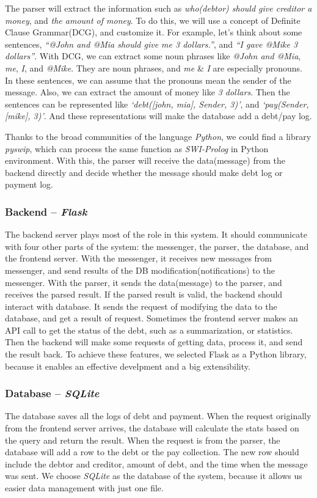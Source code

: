 \documentclass[11pt]{article}
\begin{document}
The parser will extract the information such as
\textit{who(debtor) should give creditor a money}, and \textit{the amount of money}.
To do this, we will use a concept of Definite Clause Grammar(DCG), and customize it.
For example, let's think about some sentences,
\textit{``@John and @Mia should give me 3 dollars.''},
and \textit{``I gave @Mike 3 dollars''}.
With DCG, we can extract some noun phrases like
\textit{@John and @Mia}, \textit{me}, \textit{I}, and \textit{@Mike}.
They are noun phrases, and \textit{me} \& \textit{I} are especially pronouns.
In these sentences, we can assume that the pronouns mean the sender of the message.
Also, we can extract the amount of money like \textit{3 dollars}.
Then the sentences can be represented like \textit{`debt([john, mia], Sender, 3)'},
and \textit{`pay(Sender, [mike], 3)'}. And these representations will
make the database add a debt/pay log.

Thanks to the broad communities of the language \textit{Python},
we could find a library \textit{pyswip},
which can process the same function as \textit{SWI-Prolog} in Python environment.
With this, the parser will receive the data(message) from the backend directly
and decide whether the message should make debt log or payment log.

\subsubsection{Backend -- \textit{Flask}}
The backend server plays most of the role in this system.
It should communicate with four other parts of the system:
the messenger, the parser, the database, and the frontend server.
With the messenger, it receives new messages from messenger,
and send results of the DB modification(notifications) to the messenger.
With the parser, it sends the data(message) to the parser,
and receives the parsed result.
If the parsed result is valid, the backend should interact with database.
It sends the request of modifying the data to the database,
and get a result of request.
Sometimes the frontend server makes an API call to get the status of the debt,
such as a summarization, or statistics.
Then the backend will make some requests of getting data, process it, and send the result back.
To achieve these features, we selected Flask as a Python library,
because it enables an effective develpment and a big extensibility.

\subsubsection{Database -- \textit{SQLite}}
The database saves all the logs of debt and payment.
When the request originally from the frontend server arrives, the database
will calculate the stats based on the query and return the result.
When the request is from the parser, the database will add a row to the
debt or the pay collection.
The new row should include the debtor and creditor, amount of debt,
and the time when the message was sent.
We choose \textit{SQLite} as the database of the system,
because it allows us easier data management with just one file.
\end{document}
